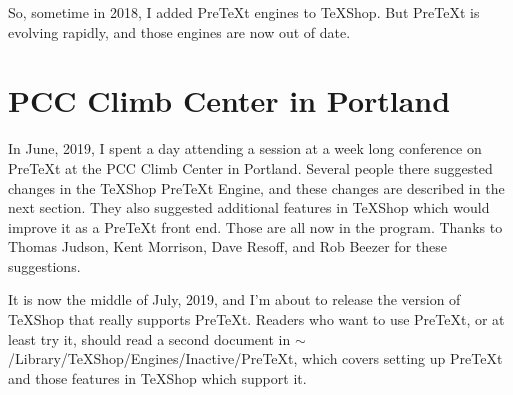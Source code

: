 \documentclass[11pt, oneside]{article}   	%
\begin{document}
So, sometime in 2018, I added PreTeXt engines to TeXShop. But PreTeXt is evolving rapidly, and those engines are now out of date.

\newpage

\section{PCC Climb Center in Portland}

In June, 2019, I spent a day attending a session at a week long  conference on PreTeXt at the PCC Climb Center in Portland.
Several people there suggested changes in the TeXShop PreTeXt Engine, and these changes are described in the next section. They also suggested additional features in TeXShop which would improve it as a PreTeXt front end. Those are all now in the program. Thanks to Thomas Judson, Kent Morrison, Dave Resoff, and Rob Beezer
for these suggestions.

It is now the middle of July, 2019, and I'm about to release the version of TeXShop that really supports PreTeXt.
Readers who want to use PreTeXt, or at least try it, should read a second document  in $\sim$/Library/TeXShop/Engines/Inactive/PreTeXt, which  covers setting up PreTeXt and those features in TeXShop which support it.
\end{document}
